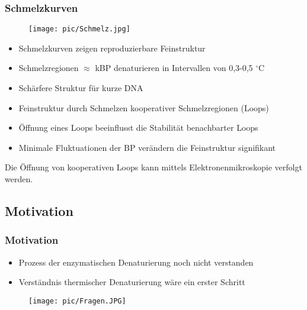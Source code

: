 \begin{frame}
\frametitle{Schmelzkurven}
\begin{minipage}{5.2cm}
\begin{figure}[h]
	\centering
		\texttt{[image: pic/Schmelz.jpg]}
\end{figure}
\centering
\tiny\cite{GOT83}
\end{minipage}
\begin{minipage}{5.0cm}
\small{
\begin{itemize}
\item Schmelzkurven zeigen reproduzierbare Feinstruktur
\item Schmelzregionen $\approx$ kBP denaturieren in Intervallen von 0,3-0,5 $^\circ$C
\item Schärfere Struktur für kurze DNA
\end{itemize}}
\end{minipage}
\begin{block}{}
\begin{itemize}
\item Feinstruktur durch Schmelzen kooperativer Schmelzregionen (Loops)
\item Öffnung eines Loops beeinflusst die Stabilität benachbarter Loops
\item Minimale Fluktuationen der BP verändern die Feinstruktur signifikant 
\end{itemize}
\end{block}
\centering
Die Öffnung von kooperativen Loops kann mittels Elektronenmikroskopie verfolgt werden.
\end{frame}


\subsection{Motivation}
\begin{frame}
\frametitle{Motivation}
\vspace{0.8cm}
\begin{itemize}
\item Prozess der enzymatischen Denaturierung noch nicht verstanden
\item Verständnis thermischer Denaturierung wäre ein erster Schritt
\end{itemize}
\vspace{0.6cm}
\begin{figure}[]
	\centering
		\texttt{[image: pic/Fragen.JPG]}
\end{figure}
\end{frame}

